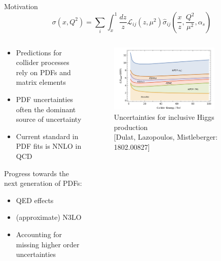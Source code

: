 \documentclass[aspectratio=169, 9pt,t]{beamer}
\begin{document}
\begin{frame}{Motivation}
  $$\sigma(x,Q^2)=\sum_i \int_x^1 \frac{dz}{z} \mathcal{L}_{ij}(z,\mu^2)\hat{\sigma}_{ij}\left(\frac{x}{z},\frac{Q^2}{\mu^2},\alpha_s\right)$$

  \begin{columns}
    \begin{column}{0.49\textwidth}
      \begin{itemize}
        \item Predictions for collider processes rely on PDFs and matrix elements
        \item PDF uncertainties often the dominant source of uncertainty
        \item Current standard in PDF fits is NNLO in QCD
      \end{itemize}

      \vspace*{0.5em}
      Progress towards the next generation of PDFs:
      \begin{itemize}
        \item QED effects
        \item (approximate) N3LO
        \item Accounting for missing higher order uncertainties
      \end{itemize}
    \end{column}
    \begin{column}{0.49\textwidth}
      \begin{figure}
        \centering
        \includegraphics[width=0.8\textwidth]{figures/sources_of_unc_higgs.png}
        \caption*{ \small Uncertainties for inclusive Higgs production \\  {\color{gray}\small [Dulat, Lazopoulos, Mistleberger: 1802.00827]}}
      \end{figure}
    \end{column}
  \end{columns}
\end{frame}
\end{document}
